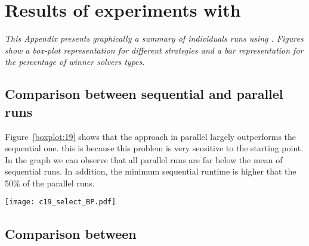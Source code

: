 \chapter{Results of experiments with \carrp}
\label{app:cap}
\textit{This Appendix presents graphically a summary of individuals runs using \carrp. Figures show a \textit{box-plot} representation for different strategies and a bar representation for the percentage of winner solvers types.}

\vspace{2ex}\vfill
\minitoc
\newpage

\section{Comparison between sequential and parallel runs}

%

\begin{minipage}[c]{0.50\textwidth}
Figure~\ref{boxplot:19} shows that the approach in parallel largely outperforms the sequential one. this is because this problem is very sensitive to the starting point. In the graph we can observe that all parallel runs are far below the mean of sequential runs. In addition, the minimum sequential runtime is higher that the 50\% of the parallel runs.
\end{minipage}\hspace{0.05\textwidth}
\begin{minipage}[c]{0.40\textwidth}
\centering
\texttt{[image: c19\_select\_BP.pdf]}
\label{boxplot:19}
\end{minipage}

\section{Comparison between \commstrs}

